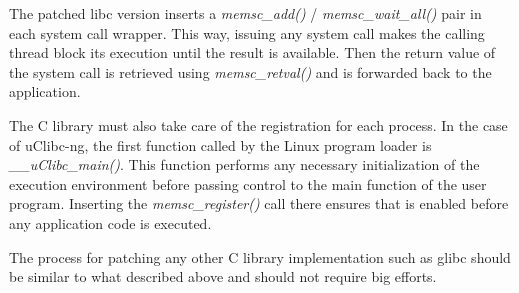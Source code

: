 The patched libc version inserts a \emph{memsc\_add()} /
\emph{memsc\_wait\_all()} pair in each system call wrapper. This way, issuing
any system call makes the calling thread block its execution until the result
is available. Then the return value of the system call is retrieved using
\emph{memsc\_retval()} and is forwarded back to the application.

The C library must also take care of the \memsc registration for each process.
In the case of uClibc-ng, the first function called by the Linux program loader
is \emph{\_\_uClibc\_main()}. This function performs any necessary
initialization of the execution environment before passing control to the main
function of the user program. Inserting the \emph{memsc\_register()} call there
ensures that \memsc is enabled before any application code is executed.

The process for patching any other C library implementation such as glibc
should be similar to what described above and should not require big efforts.
